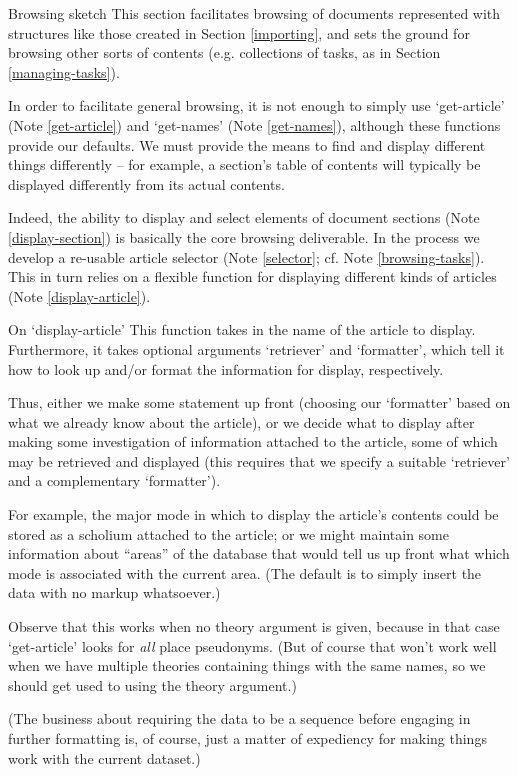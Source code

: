 \begin{notate}{Browsing sketch} \label{browsing-sketch}
This section facilitates browsing of documents represented
with structures like those created in Section
\ref{importing}, and sets the ground for browsing other
sorts of contents (e.g. collections of tasks, as in
Section \ref{managing-tasks}).

In order to facilitate general browsing, it is not enough
to simply use `get-article' (Note \ref{get-article}) and
`get-names' (Note \ref{get-names}), although these
functions provide our defaults.  We must provide the means
to find and display different things differently -- for
example, a section's  table of contents will typically
be displayed differently from its actual contents.

Indeed, the ability to display and select elements of
document sections (Note \ref{display-section}) is
basically the core browsing deliverable.  In the process
we develop a re-usable article selector (Note
\ref{selector}; cf. Note \ref{browsing-tasks}).  This in
turn relies on a flexible function for displaying
different kinds of articles (Note \ref{display-article}).
\end{notate}

\begin{notate}{On `display-article'} \label{display-article}
This function takes in the name of the article to display.
Furthermore, it takes optional arguments `retriever' and
`formatter', which tell it how to look up and/or format
the information for display, respectively.

Thus, either we make some statement up front (choosing our
`formatter' based on what we already know about the
article), or we decide what to display after making some
investigation of information attached to the article, some
of which may be retrieved and displayed (this requires
that we specify a suitable `retriever' and a complementary
`formatter').

For example, the major mode in which to display the
article's contents could be stored as a scholium attached
to the article; or we might maintain some information
about ``areas'' of the database that would tell us up
front what which mode is associated with the current area.
(The default is to simply insert the data with no markup
whatsoever.)

Observe that this works when no theory argument is given,
because in that case `get-article' looks for \emph{all}
place pseudonyms.  (But of course that won't work well
when we have multiple theories containing things with the
same names, so we should get used to using the theory
argument.)

(The business about requiring the data to be a sequence
before engaging in further formatting is, of course, just
a matter of expediency for making things work with the
current dataset.)
\end{notate}

